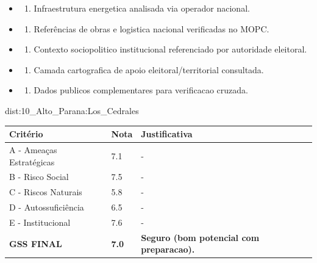 {\begin{itemize}
\item
  \begin{enumerate}
  \def\labelenumi{\arabic{enumi})}
  \setcounter{enumi}{7}
  \tightlist
  \item
    Infraestrutura energetica analisada via operador nacional.
  \end{enumerate}
\item
  \begin{enumerate}
  \def\labelenumi{\arabic{enumi})}
  \setcounter{enumi}{8}
  \tightlist
  \item
    Referências de obras e logistica nacional verificadas no MOPC.
  \end{enumerate}
\item
  \begin{enumerate}
  \def\labelenumi{\arabic{enumi})}
  \setcounter{enumi}{9}
  \tightlist
  \item
    Contexto sociopolitico institucional referenciado por autoridade
    eleitoral.
  \end{enumerate}
\item
  \begin{enumerate}
  \def\labelenumi{\arabic{enumi})}
  \setcounter{enumi}{10}
  \tightlist
  \item
    Camada cartografica de apoio eleitoral/\allowbreak territorial consultada.
  \end{enumerate}
\item
  \begin{enumerate}
  \def\labelenumi{\arabic{enumi})}
  \setcounter{enumi}{11}
  \tightlist
  \item
    Dados publicos complementares para verificacao cruzada.
  \end{enumerate}
\end{itemize}}{dist:10_Alto_Parana:Los_Cedrales}
\begin{table}[ht!]
\small \begin{tabular}{p{3.0cm}p{0.8cm}p{6.0cm}} \toprule
\textbf{Critério} & \textbf{Nota} & \textbf{Justificativa} \\ \midrule
A - Ameaças Estratégicas & 7.1 & - \\
B - Risco Social & 7.5 & - \\
C - Riscos Naturais & 5.8 & - \\
D - Autossuficiência & 6.5 & - \\
E - Institucional & 7.6 & - \\
\midrule \textbf{GSS FINAL} & \textbf{7.0} & \textbf{Seguro (bom potencial com preparacao).} \\ \bottomrule \end{tabular}
\end{table}

